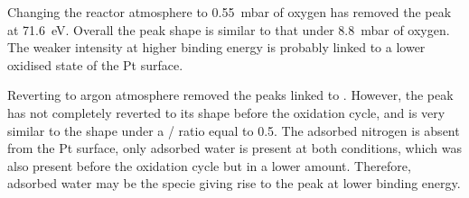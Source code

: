 Changing the reactor atmosphere to \qty{0.55}{\milli\bar} of oxygen has removed the peak at \qty{71.6}{\eV}.
Overall the peak shape is similar to that under \qty{8.8}{\milli\bar} of oxygen.
The weaker intensity at higher binding energy is probably linked to a lower oxidised state of the Pt surface.

Reverting to argon atmosphere removed the peaks linked to .
However, the peak has not completely reverted to its shape before the oxidation cycle, and is very similar to the shape under a / ratio equal to \num{0.5}.
The adsorbed nitrogen is absent from the Pt surface, only adsorbed water is present at both conditions, which was also present before the oxidation cycle but in a lower amount.
Therefore, adsorbed water may be the specie giving rise to the peak at lower binding energy.
